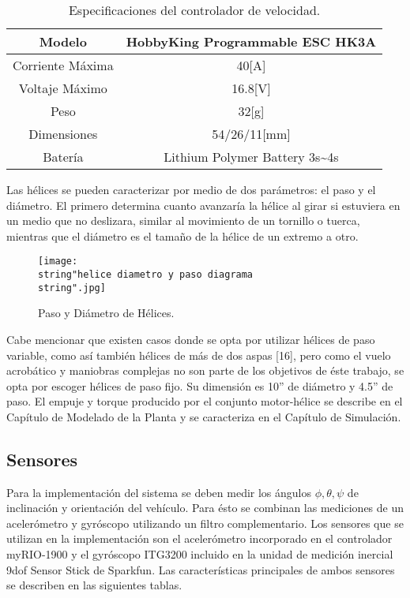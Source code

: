 \documentclass[../main.tex]{subfiles}
\begin{document}
\begin{table}[H]
\noindent \begin{centering}
\begin{tabular}{|c|c|}
\hline 
\multicolumn{1}{|c}{Modelo } & HobbyKing Programmable ESC HK3A\tabularnewline
\hline 
\hline 
Corriente Máxima & 40{[}A{]}\tabularnewline
\hline 
Voltaje Máximo & 16.8{[}V{]}\tabularnewline
\hline 
Peso & 32{[}g{]}\tabularnewline
\hline 
Dimensiones & 54/26/11{[}mm{]}\tabularnewline
\hline 
Batería & Lithium Polymer Battery 3s\textasciitilde{}4s\tabularnewline
\hline 
\end{tabular}
\par\end{centering}
\caption{Especificaciones del controlador de velocidad.}
\end{table}

\textcompwordmark{}

Las hélices se pueden caracterizar por medio de dos parámetros: el
paso y el diámetro. El primero determina cuanto avanzaría la hélice
al girar si estuviera en un medio que no deslizara, similar al movimiento
de un tornillo o tuerca, mientras que el diámetro es el tamaño de
la hélice de un extremo a otro. 

\begin{figure}[H]
\noindent \begin{centering}
\texttt{[image: \\string"helice diametro y paso diagrama\\string".jpg]}
\par\end{centering}
\caption{Paso y Diámetro de Hélices.}
\end{figure}

Cabe mencionar que existen casos donde se opta por utilizar hélices
de paso variable, como así también hélices de más de
dos aspas [16], pero como el vuelo acrobático y maniobras
complejas no son parte de los objetivos de éste trabajo, se opta por
escoger hélices de paso fijo. Su dimensión es 10'' de diámetro y 4.5'' de paso. 
El empuje y torque producido por el conjunto motor-hélice se describe en el Capítulo de Modelado de la Planta y se caracteriza en el Capítulo de Simulación.


\subsection{Sensores}

Para la implementación del sistema se deben medir los ángulos $ \phi, \theta, \psi $ de inclinación
y orientación del vehículo. Para ésto se combinan las mediciones de
un acelerómetro y gyróscopo utilizando un filtro complementario. Los
sensores que se utilizan en la implementación son el acelerómetro
incorporado en el controlador myRIO-1900 y el gyróscopo ITG3200 incluido
en la unidad de medición inercial 9dof Sensor Stick de Sparkfun. Las
características principales de ambos sensores se describen en las
siguientes tablas.
\end{document}
